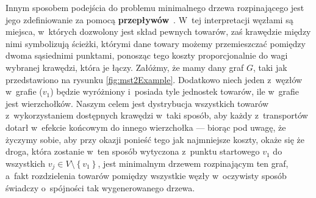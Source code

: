 Innym sposobem podejścia do problemu minimalnego drzewa rozpinającego jest jego zdefiniowanie za pomocą \textbf{przepływów}~\cite[$38$--$44$]{Magnanti1995503}.
W~tej interpretacji węzłami są miejsca, w~których dozwolony jest skład pewnych towarów, zaś krawędzie między nimi symbolizują ścieżki, którymi dane towary możemy przemieszczać pomiędzy dwoma sąsiednimi punktami, ponosząc tego koszty proporcjonalnie do wagi wybranej krawędzi, która je łączy.
Załóżmy, że mamy dany graf $G$, taki jak przedstawiono na rysunku \ref{fig:mst2Example}.
Dodatkowo niech jeden z~węzłów w~grafie ($v_{1}$) będzie wyróżniony i~posiada tyle jednostek towarów, ile w~grafie jest wierzchołków.
Naszym celem jest dystrybucja wszystkich towarów z~wykorzystaniem dostępnych krawędzi w~taki sposób, aby każdy z~transportów dotarł w~efekcie końcowym do innego wierzchołka --- biorąc pod uwagę, że życzymy sobie, aby przy okazji ponieść tego jak najmniejsze koszty, okaże się że droga, która zostanie w~ten sposób wytyczona z~punktu startowego $v_{1}$ do wszystkich $v_{j} \in V \setminus \left\{ v_{1} \right\}$, jest minimalnym drzewem rozpinającym ten graf, a~fakt rozdzielenia towarów pomiędzy wszystkie węzły w~oczywisty sposób świadczy o~spójności tak wygenerowanego drzewa.


